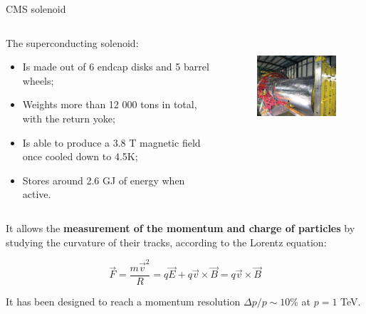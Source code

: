 \documentclass[8pt]{beamer}
\begin{document}
\begin{frame}{CMS solenoid}
\justifying
\begin{columns}
	\begin{column}{0.46 \textwidth}
	\justifying
The \alert{superconducting solenoid}:
\begin{itemize}
\justifying
\item Is made out of 6 endcap disks and 5 barrel wheels;
\item Weights more than 12 000 tons in total, with the return yoke;
\item Is able to produce a 3.8 T magnetic field once cooled down to 4.5K;
\item Stores around 2.6 GJ of energy when active.
\end{itemize}
\end{column}
	\begin{column}{0.51 \textwidth}
\begin{figure}[htbp]
\begin{center}
\includegraphics[width=5.5cm, height=3.7cm]{figs/CMSMagnet.jpg}
\end{center}
\end{figure}
	\end{column}
	\end{columns} \vfill

It allows the \textbf{measurement of the momentum and charge of particles} by studying the curvature of their tracks, according to the Lorentz equation:

\begin{equation*}
\overrightarrow{F} = \frac{m \overrightarrow{v}^2}{R} =  q \overrightarrow{E} + q \overrightarrow{v} \times \overrightarrow{B} = q \overrightarrow{v} \times \overrightarrow{B}
\end{equation*}
\vfill

It has been designed to reach a momentum resolution $\Delta p/p \sim 10$\% at $p = 1$ TeV. \vfill
\end{frame}
\end{document}
